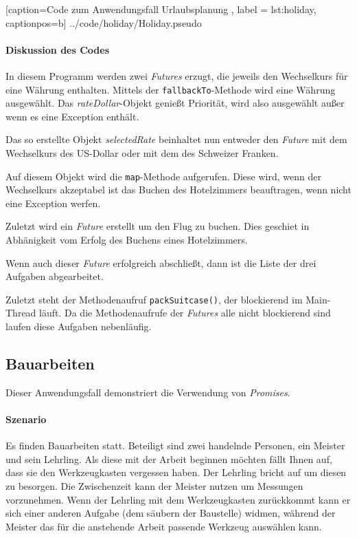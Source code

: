
    [caption={Code zum Anwendungsfall \glqq Urlaubsplanung\grqq{} },
       label = lst:holiday,
       captionpos=b]
 {../code/holiday/Holiday.pseudo}
 
\paragraph{Diskussion des Codes}

In diesem Programm werden zwei \emph{Futures} erzugt, die jeweils
den Wechselkurs für eine Währung enthalten. Mittels der
\texttt{fallbackTo}-Methode wird eine Währung ausgewählt.
Das \emph{rateDollar}-Objekt genießt Priorität, wird also ausgewählt
außer wenn es eine Exception enthält.

Das so erstellte Objekt \emph{selectedRate} beinhaltet nun entweder
den \emph{Future} mit dem Wechselkurs des US-Dollar oder mit dem des
Schweizer Franken.

Auf diesem Objekt wird die \texttt{map}-Methode aufgerufen. Diese wird,
wenn der Wechselkurs akzeptabel ist das Buchen des Hotelzimmers beauftragen,
wenn nicht eine Exception werfen.

Zuletzt wird ein \emph{Future} erstellt um den Flug zu buchen. Dies
geschiet in Abhänigkeit vom Erfolg des Buchens eines Hotelzimmers.

Wenn auch dieser \emph{Future} erfolgreich abschließt, dann ist die
Liste der drei Aufgaben abgearbeitet.

Zuletzt steht der Methodenaufruf \texttt{packSuitcase()}, der blockierend
im Main-Thread läuft. Da die Methodenaufrufe der \emph{Futures} alle
nicht blockierend sind laufen diese Aufgaben nebenläufig.

\subsection{Bauarbeiten}

Dieser Anwendungsfall demonstriert die Verwendung von \emph{Promises}.

\paragraph{Szenario}

Es finden Bauarbeiten statt. Beteiligt sind zwei handelnde Personen,
ein Meister und sein Lehrling. Als diese mit der Arbeit beginnen möchten
fällt Ihnen auf, dass sie den Werkzeugkasten vergessen haben. Der
Lehrling bricht auf um diesen zu besorgen. Die Zwischenzeit kann
der Meister nutzen um Messungen vorzunehmen. Wenn der Lehrling mit
dem Werkzeugkasten zurückkommt kann er sich einer anderen Aufgabe
(dem säubern der Baustelle) widmen, während der Meister das für die
anstehende Arbeit passende Werkzeug auswählen kann.


